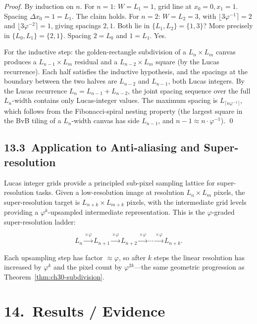 \begin{proof}
By induction on $n$.  For $n = 1$: $W = L_1 = 1$,
grid line at $x_0 = 0, x_1 = 1$.  Spacing
$\Delta x_0 = 1 = L_1$.  The claim holds.  For
$n = 2$: $W = L_2 = 3$, with $\lfloor 3\varphi^{-1} \rceil
= 2$ and $\lfloor 3\varphi^{-2} \rceil = 1$, giving
spacings $2, 1$.  Both lie in $\{L_1, L_2\} = \{1, 3\}$?
More precisely in $\{L_0, L_1\} = \{2, 1\}$.
Spacing $2 = L_0$ and $1 = L_1$.  Yes.

For the inductive step: the golden-rectangle
subdivision of a $L_n \times L_m$ canvas produces
a $L_{n-1} \times L_m$ residual and a $L_{n-2}
\times L_m$ square (by the Lucas recurrence).
Each half satisfies the inductive hypothesis,
and the spacings at the boundary between the
two halves are $L_{n-2}$ and $L_{n-1}$, both
Lucas integers.  By the Lucas recurrence
$L_n = L_{n-1} + L_{n-2}$, the joint spacing
sequence over the full $L_n$-width contains
only Lucas-integer values.  The maximum spacing
is $L_{\lceil n\varphi^{-1} \rceil}$,
which follows from the Fibonacci-spiral nesting
property (the largest square in the BvB tiling
of a $L_n$-width canvas has side $L_{n-1}$,
and $n-1 \approx n \cdot \varphi^{-1}$).
\qed
\end{proof}

\subsection{13.3\ Application to Anti-aliasing
  and Super-resolution}\label{subsec:ch30-superres}

Lucas integer grids provide a principled
sub-pixel sampling lattice for super-resolution
tasks.  Given a low-resolution image at resolution
$L_n \times L_m$ pixels, the super-resolution
target is $L_{n+k} \times L_{m+k}$ pixels, with
the intermediate grid levels providing a
$\varphi^k$-upsampled intermediate representation.
This is the $\varphi$-graded super-resolution
ladder:

\[L_n \xrightarrow{\times\varphi} L_{n+1}
  \xrightarrow{\times\varphi} L_{n+2}
  \xrightarrow{\times\varphi} \cdots
  \xrightarrow{\times\varphi} L_{n+k}.\]

Each upsampling step has factor $\approx\varphi$,
so after $k$ steps the linear resolution has
increased by $\varphi^k$ and the pixel count by
$\varphi^{2k}$---the same geometric progression
as Theorem~\ref{thm:ch30-subdivision}.

\section{14.\ Results / Evidence}%
  \label{sec:ch30-results}

